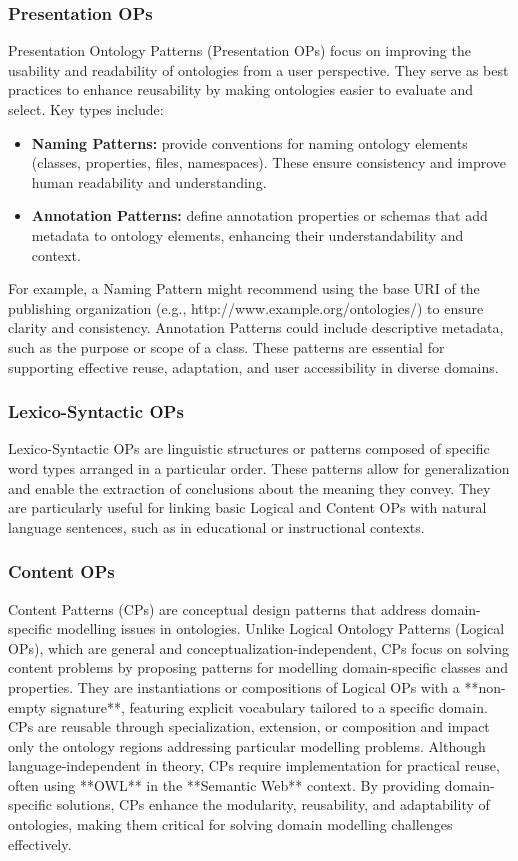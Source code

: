 \subsubsection{Presentation OPs}
Presentation Ontology Patterns (Presentation OPs) focus on improving the usability and readability of ontologies from a user perspective. They serve as best practices to enhance reusability by making ontologies easier to evaluate and select. Key types include:
\begin{itemize}
    \item \textbf{Naming Patterns:} provide conventions for naming ontology elements (classes, properties, files, namespaces). These ensure consistency and improve human readability and understanding.

    \item \textbf{Annotation Patterns:} define annotation properties or schemas that add metadata to ontology elements, enhancing their understandability and context.
\end{itemize}
For example, a Naming Pattern might recommend using the base URI of the publishing organization (e.g., http://www.example.org/ontologies/) to ensure clarity and consistency. Annotation Patterns could include descriptive metadata, such as the purpose or scope of a class. These patterns are essential for supporting effective reuse, adaptation, and user accessibility in diverse domains.

\subsubsection{Lexico-Syntactic OPs}
Lexico-Syntactic OPs are linguistic structures or patterns composed of specific word types arranged in a particular order. These patterns allow for generalization and enable the extraction of conclusions about the meaning they convey. They are particularly useful for linking basic Logical and Content OPs with natural language sentences, such as in educational or instructional contexts.

\subsubsection{Content OPs}
Content Patterns (CPs) are conceptual design patterns that address domain-specific modelling issues in ontologies. Unlike Logical Ontology Patterns (Logical OPs), which are general and conceptualization-independent, CPs focus on solving content problems by proposing patterns for modelling domain-specific classes and properties. They are instantiations or compositions of Logical OPs with a **non-empty signature**, featuring explicit vocabulary tailored to a specific domain. CPs are reusable through specialization, extension, or composition and impact only the ontology regions addressing particular modelling problems. Although language-independent in theory, CPs require implementation for practical reuse, often using **OWL** in the **Semantic Web** context. By providing domain-specific solutions, CPs enhance the modularity, reusability, and adaptability of ontologies, making them critical for solving domain modelling challenges effectively.

